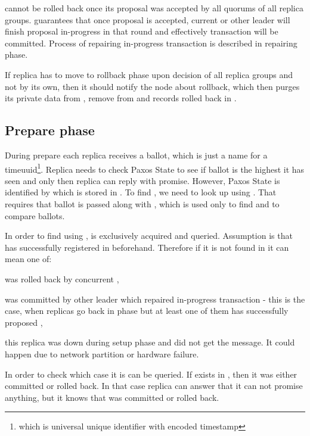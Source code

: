 \transaction cannot be rolled back once its proposal was accepted by all quorums of all replica groups. \paxos guarantees that once proposal is accepted, current or other leader will finish proposal in-progress in that round and effectively transaction will be committed. Process of repairing in-progress transaction is described in repairing phase.

If replica has to move to rollback phase upon decision of all replica groups and not by its own, then it should notify the node about rollback, which then purges its private data from \txStorage, remove \txState from \txIndex and records rolled back \transaction in \txLog.


\subsection{Prepare phase}
During prepare each replica receives a ballot, which is just a name for a timeuuid\footnote{which is universal unique identifier with encoded timestamp}. Replica needs to check Paxos State to see if ballot is the highest it has seen and only then replica can reply with promise. However, Paxos State is identified by \paxosRoundId which is stored in \txIndex. To find \paxosRoundId, we need to look up \txIndex using \txState. That requires that ballot is passed along with \txState, which is used only to find \paxosRoundId and to compare ballots.

In order to find \paxosRoundId using \txState, \txIndex is exclusively acquired and queried. Assumption is that \transaction has successfully registered in \txIndex beforehand. Therefore if it is not found in \txIndex it can mean one of:
\begin{enumerate*}
\item \transaction was rolled back by concurrent \transactionj,
\item \transaction was committed by other leader which repaired in-progress transaction - this is the case, when replicas go back in phase but at least one of them has successfully proposed \txState,
\item this replica was down during setup phase and did not get the message. It could happen due to network partition or hardware failure.
\end{enumerate*}


In order to check which case it is \txLog can be queried. If \txState exists in \txLog, then it was either committed or rolled back. In that case replica can answer that it can not promise anything, but it knows that \transaction was committed or rolled back.

